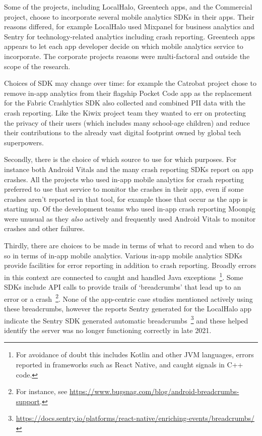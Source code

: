 Some of the projects, including LocalHalo, Greentech apps, and the Commercial project, choose to incorporate several mobile analytics SDKs in their apps. Their reasons differed, for example LocalHalo used Mixpanel for business analytics and Sentry for technology-related analytics including crash reporting. Greentech apps appears to let each app developer decide on which mobile analytics service to incorporate. The corporate projects reasons were multi-factoral and outside the scope of the research.

Choices of SDK may change over time: for example the Catrobat project chose to remove in-app analytics from their flagship Pocket Code app as the replacement for the Fabric Crashlytics SDK also collected and combined PII data with the crash reporting. Like the Kiwix project team they wanted to err on protecting the privacy of their users (which includes many school-age children) and reduce their contributions to the already vast digital footprint owned by global tech superpowers.

Secondly, there is the choice of which source to use for which purposes. For instance both Android Vitals and the many crash reporting SDKs report on app crashes. All the projects who used in-app mobile analytics for crash reporting preferred to use that service to monitor the crashes in their app, even if some crashes aren't reported in that tool, for example those that occur as the app is starting up. Of the development teams who used in-app crash reporting Moonpig were unusual as they \textit{also} actively and frequently used Android Vitals to monitor crashes and other failures.

Thirdly, there are choices to be made in terms of what to record and when to do so in terms of in-app mobile analytics. Various in-app mobile analytics SDKs provide facilities for error reporting in addition to crash reporting. Broadly errors in this context are connected to caught and handled Java exceptions~\footnote{For avoidance of doubt this includes Kotlin and other JVM languages, errors reported in frameworks such as React Native, and caught signals in C++ code.}. Some SDKs include API calls to provide trails of `breadcrumbs' that lead up to an error or a crash~\footnote{For instance, see \url{https://www.bugsnag.com/blog/android-breadcrumbs-support}.}. None of the app-centric case studies mentioned actively using these breadcrumbs, however the reports Sentry generated for the LocalHalo app indicate the Sentry SDK generated automatic breadcrumbs~\footnote{\url{https://docs.sentry.io/platforms/react-native/enriching-events/breadcrumbs/}} and these helped identify the server was no longer functioning correctly in late 2021. 

